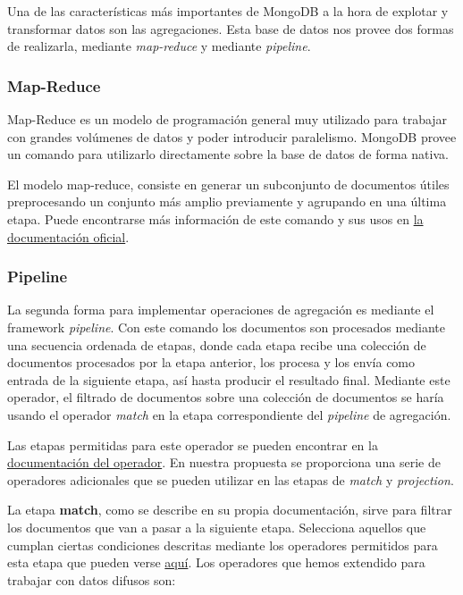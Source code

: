 Una de las características más importantes de MongoDB a la hora de explotar y transformar datos son las agregaciones. Esta base de datos nos provee dos formas de realizarla, mediante \textit{map-reduce} y mediante \textit{pipeline}.

\subsubsection{Map-Reduce}\label{mapreduce}

Map-Reduce es un modelo de programación general muy utilizado para trabajar con grandes volúmenes de datos y poder introducir paralelismo. MongoDB provee un comando para utilizarlo directamente sobre la base de datos de forma nativa.

El modelo map-reduce, consiste en generar un subconjunto de documentos útiles preprocesando un conjunto más amplio previamente y agrupando en una última etapa. Puede encontrarse más información de este comando y sus usos en \href{https://docs.mongodb.com/manual/core/map-reduce/}{la documentación oficial}.

\subsubsection{Pipeline}\label{pipeline}

La segunda forma para implementar operaciones de agregación es mediante el framework \textit{pipeline}. Con este comando los documentos son procesados mediante una secuencia ordenada de etapas, donde cada etapa recibe una colección de documentos procesados por la etapa anterior, los procesa y los envía como entrada de la siguiente etapa, así hasta producir el resultado final. Mediante este operador, el filtrado de documentos sobre una colección de documentos se haría usando el operador \textit{match} en la etapa correspondiente del \textit{pipeline} de agregación.

Las etapas permitidas para este operador se pueden encontrar en la \href{https://docs.mongodb.com/manual/reference/operator/aggregation-pipeline/}{documentación del operador}. En nuestra propuesta se proporciona una serie de operadores adicionales que se pueden utilizar en las etapas de \textit{match} y \textit{projection}.

La etapa \textbf{match}, como se describe en su propia documentación, sirve para filtrar los documentos que van a pasar a la siguiente etapa. Selecciona aquellos que cumplan ciertas condiciones descritas mediante los operadores permitidos para esta etapa que pueden verse \href{https://docs.mongodb.com/manual/reference/operator/query/}{aquí}. Los operadores que hemos extendido para trabajar con datos difusos son:

